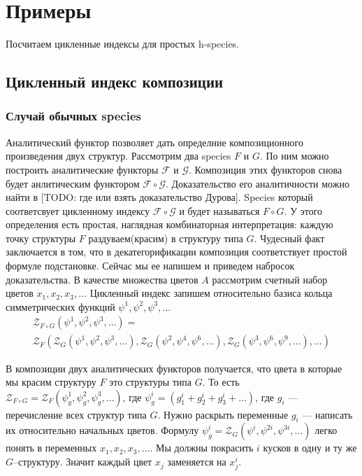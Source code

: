 \section{Примеры}
Посчитаем цикленные индексы для простых h-species.
$$

$$

\subsection{Цикленный индекс композиции}
\subsubsection{Случай обычных species}
Аналитический функтор позволяет дать определние композиционного произведения
двух структур. Рассмотрим два species $F$ и $G$. По ним можно построить
аналитические функторы $\mathcal F$ и $\mathcal G$. Композиция этих функторов
снова будет анлитическим функтором $\mathcal F \circ \mathcal G$. Доказательство
его аналитичности можно найти в [TODO: где или взять доказательство Дурова].
Species который соответсвует цикленному индексу $\mathcal F \circ \mathcal G$ и
будет называться $F \circ G$. У этого определения есть простая, наглядная
комбинаторная интерпретация: каждую точку структуры $F$ раздуваем(красим) в
структуру типа $G$. Чудесный факт заключается в том, что в декатегорификации
композиция соответствует простой формуле подстановке. Сейчас мы ее напишем и
приведем набросок доказательства. В качестве множества цветов $A$ рассмотрим
счетный набор цветов $x_1, x_2, x_3, \dots$ Цикленный индекс запишем
относительно базиса кольца симметрических функций $\psi^1, \psi^2, \psi^3, \dots$
\begin{multline}
\label{eq:zfg}
	\mathcal Z_{F \circ G} (\psi^1, \psi^2, \psi^3, \dots) = \\
	\mathcal Z_F(
		\mathcal Z_G(\psi^1, \psi^2, \psi^3, \dots),
		\mathcal Z_G(\psi^2, \psi^4, \psi^6, \dots),
		\mathcal Z_G(\psi^3, \psi^6, \psi^9, \dots),
		\dots
	)
\end{multline}

В композиции двух аналитических функторов получается, что цвета в которые мы
красим структуру $F$ это структуры типа $G$. То есть $\mathcal Z_{F \circ G} =
\mathcal Z_F(\psi_g^1, \psi_g^2, \psi_g^3, \dots)$, где $\psi_g^i = (g_1^i +
g_2^i + g_3^i + \dots)$, где $g_i$ --- перечисление всех структур типа $G$.
Нужно раскрыть переменные $g_i $ --- написать их относительно начальных цветов.
Формулу $\psi_g^i = \mathcal Z_G(\psi^i, \psi^{2i}, \psi^{3i}, \dots)$ легко
понять в переменных $x_1, x_2, x_3, \dots$. Мы должны покрасить $i$ кусков в
одну и ту же $G$--структуру. Значит каждый цвет $x_j$ заменяется на $x_j^i$.

